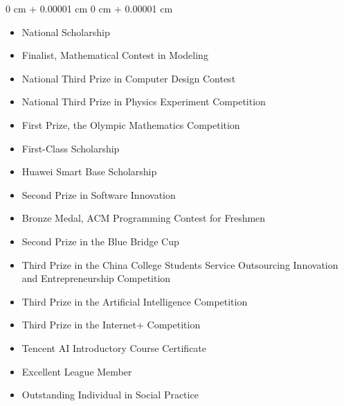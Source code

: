 \documentclass[10pt, letterpaper]{article}
\newenvironment{highlights}{
    \begin{itemize}[
        topsep=0.10 cm,
        parsep=0.10 cm,
        partopsep=0pt,
        itemsep=0pt,
        leftmargin=0 cm + 10pt
    ]
}{
    \end{itemize}
} %
\newenvironment{onecolentry}{
    \begin{adjustwidth}{
        0 cm + 0.00001 cm
    }{
        0 cm + 0.00001 cm
    }
}{
    \end{adjustwidth}
} %
\begin{document}
        \begin{onecolentry}
            \begin{highlights}
                \item National Scholarship
                \item Finalist, Mathematical Contest in Modeling
                \item National Third Prize in Computer Design Contest
                \item National Third Prize in Physics Experiment Competition
                \item First Prize, the Olympic Mathematics Competition
                \item First-Class Scholarship
                \item Huawei Smart Base Scholarship
                \item Second Prize in Software Innovation
                \item Bronze Medal, ACM Programming Contest for Freshmen
                \item Second Prize in the Blue Bridge Cup
                \item Third Prize in the China College Students Service Outsourcing Innovation and Entrepreneurship Competition 
                \item Third Prize in the Artificial Intelligence Competition  
                \item Third Prize in the Internet+ Competition 
                \item Tencent AI Introductory Course Certificate  
                \item Excellent League Member
                \item Outstanding Individual in Social Practice
            \end{highlights}
        \end{onecolentry}

        \vspace{0.2 cm}



\end{document}
